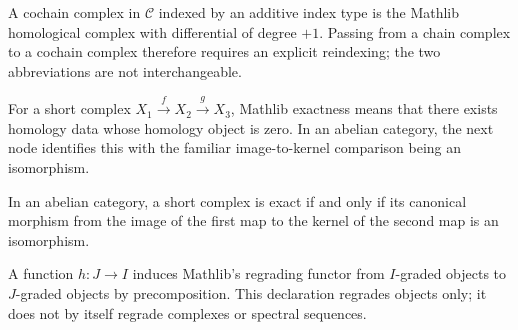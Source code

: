 \begin{definition}
  \label{def:mathlib-cochain-complex}
  \mathlibok
  A cochain complex in $\mathcal C$ indexed by an additive index type is the
  Mathlib homological complex with differential of degree $+1$.  Passing from a
  chain complex to a cochain complex therefore requires an explicit reindexing;
  the two abbreviations are not interchangeable.
\end{definition}

\begin{definition}
  \label{def:mathlib-short-complex-exact}
  \mathlibok
  For a short complex $X_1\xrightarrow{f}X_2\xrightarrow{g}X_3$, Mathlib
  exactness means that there exists homology data whose homology object is
  zero.  In an abelian category, the next node identifies this with the
  familiar image-to-kernel comparison being an isomorphism.
\end{definition}

\begin{theorem}
  \label{thm:mathlib-exact-iff-image-kernel}
  \mathlibok
  In an abelian category, a short complex is exact if and only if its canonical
  morphism from the image of the first map to the kernel of the second map is
  an isomorphism.
\end{theorem}

\begin{definition}
  \label{def:mathlib-graded-comap}
  \mathlibok
  A function $h:J\to I$ induces Mathlib's regrading functor from
  $I$-graded objects to $J$-graded objects by precomposition.  This declaration
  regrades objects only; it does not by itself regrade complexes or spectral
  sequences.
\end{definition}

